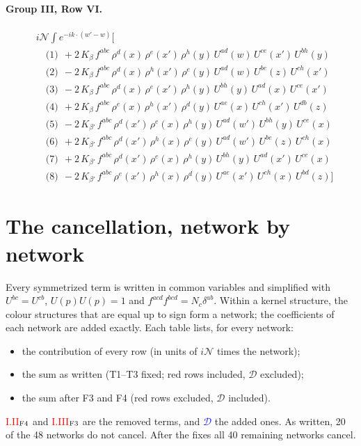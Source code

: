 \documentclass[10pt]{article}
\numberwithin{equation}{section}
\newcommand{\NN}{\mathcal N}
\begin{document}
\paragraph{Group III, Row VI.}
\begin{align*}
&i\NN\int e^{-ik\cdot(w'-w)}\Big[\\
&\quad\text{(1)}\ \ +2\,K_{\beta}\,f^{abc}\,\rho^{d}(x)\,\rho^{e}(x')\,\rho^{h}(y)\,U^{ad}(w)\,U^{ce}(x')\,U^{bh}(y)\\
&\quad\text{(2)}\ \ -2\,K_{\beta}\,f^{abc}\,\rho^{d}(x)\,\rho^{h}(x')\,\rho^{e}(y)\,U^{ad}(w)\,U^{be}(z)\,U^{ch}(x')\\
&\quad\text{(3)}\ \ -2\,K_{\beta}\,f^{abc}\,\rho^{d}(x)\,\rho^{e}(x')\,\rho^{h}(y)\,U^{bh}(y)\,U^{ad}(x)\,U^{ce}(x')\\
&\quad\text{(4)}\ \ +2\,K_{\beta}\,f^{abc}\,\rho^{e}(x)\,\rho^{h}(x')\,\rho^{d}(y)\,U^{ae}(x)\,U^{ch}(x')\,U^{db}(z)\\
&\quad\text{(5)}\ \ -2\,K_{\beta'}\,f^{abc}\,\rho^{d}(x')\,\rho^{e}(x)\,\rho^{h}(y)\,U^{ad}(w')\,U^{bh}(y)\,U^{ce}(x)\\
&\quad\text{(6)}\ \ +2\,K_{\beta'}\,f^{abc}\,\rho^{d}(x')\,\rho^{h}(x)\,\rho^{e}(y)\,U^{ad}(w')\,U^{be}(z)\,U^{ch}(x)\\
&\quad\text{(7)}\ \ +2\,K_{\beta'}\,f^{abc}\,\rho^{d}(x')\,\rho^{e}(x)\,\rho^{h}(y)\,U^{bh}(y)\,U^{ad}(x')\,U^{ce}(x)\\
&\quad\text{(8)}\ \ -2\,K_{\beta'}\,f^{abc}\,\rho^{e}(x')\,\rho^{h}(x)\,\rho^{d}(y)\,U^{ae}(x')\,U^{ch}(x)\,U^{bd}(z)\Big]
\end{align*}

\section{The cancellation, network by network}\label{sec:networks}
Every symmetrized term is written in common variables and simplified with $U^{bc}=U^{cb}$, $U(p)U(p)=1$ and $f^{acd}f^{bcd}=N_c\delta^{ab}$. Within a kernel structure, the colour structures that are equal up to sign form a network; the coefficients of each network are added exactly. Each table lists, for every network:
\begin{itemize}
\item the contribution of every row (in units of $i\NN$ times the network);
\item the sum as written (T1--T3 fixed; red rows included, $\mathcal D$ excluded);
\item the sum after F3 and F4 (red rows excluded, $\mathcal D$ included).
\end{itemize}
\textcolor{red}{I.II$_{\rm F4}$} and \textcolor{red}{I.III$_{\rm F3}$} are the removed terms, and \textcolor{blue}{$\mathcal D$} the added ones. As written, 20 of the 48 networks do not cancel. After the fixes all 40 remaining networks cancel.
\end{document}
